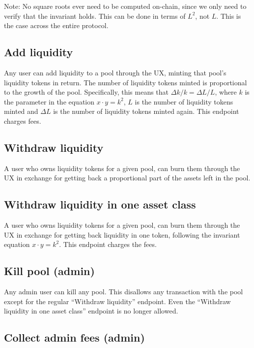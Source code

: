 \documentclass{article}
\begin{document}
Note: No square roots ever need to be computed on-chain, since we only need to
verify that the invariant holds. This can be done in terms of $L^2$, not $L$.
This is the case across the entire protocol.

\subsection{Add liquidity}

Any user can add liquidity to a pool through the UX, minting that pool’s
liquidity tokens in return. The number of liquidity tokens minted is
proportional to the growth of the pool. Specifically, this means that $\Delta k
/ k = \Delta L / L$, where $k$ is the parameter in the equation $x \cdot y =
k^2$, $L$ is the number of liquidity tokens minted and $\Delta L$ is the number
of liquidity tokens minted again. This endpoint charges fees.

\subsection{Withdraw liquidity}

A user who owns liquidity tokens for a given pool, can burn them through the UX
in exchange for getting back a proportional part of the assets left in the pool.

\subsection{Withdraw liquidity in one asset class}

A user who owns liquidity tokens for a given pool, can burn them through the UX
in exchange for getting back liquidity in one token, following the invariant
equation $x \cdot y = k^2$. This endpoint charges the fees.

\subsection{Kill pool (admin)}

Any admin user can kill any pool. This disallows any transaction with the pool
except for the regular ``Withdraw liquidity'' endpoint. Even the ``Withdraw
liquidity in one asset class'' endpoint is no longer allowed.

\subsection{Collect admin fees (admin)}
\end{document}

